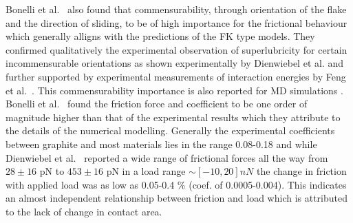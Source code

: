 Bonelli et al.\ \cite{bonelli_atomistic_2009} also found that commensurability,
through orientation of the flake and the direction of sliding, to be of high
importance for the frictional behaviour which generally alligns with the
predictions of the \acrshort{FK} type models. They confirmed qualitatively the
experimental observation of superlubricity for certain incommensurable
orientations as shown experimentally by Dienwiebel et
al.\cite{DIENWIEBEL2005197} and further supported by experimental measurements
of interaction energies by Feng et al.\ \cite{feng_superlubric_2013}. This commensurability importance is also reported for \acrshort{MD} simulations \cite{ma12091425}\cite{zhu_study_2018}\cite{Wijn_2011}. Bonelli et al.\ \cite{bonelli_atomistic_2009} found the friction force and coefficient to be one order of magnitude higher than that of the experimental results which they attribute to the details of the numerical modelling. Generally the experimental
coefficients between graphite and most materials lies in the range 0.08-0.18
\cite{DIENWIEBEL2005197} and while Dienwiebel et al.\ \cite{DIENWIEBEL2005197}
reported a wide range of frictional forces all the way from $28 \pm 16$ pN to $453 \pm 16$ pN in a load range $\sim [-10, 20] nN$ the change in friction with applied load was as low as 0.05-0.4 \% (coef. of 0.0005-0.004). This indicates an almost independent relationship between friction and load which is attributed to the lack of change in contact area. 

